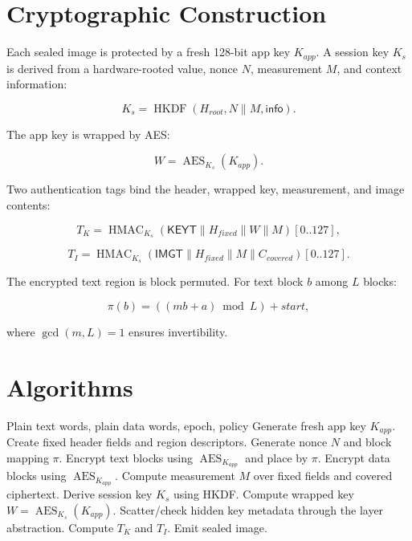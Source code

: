 \documentclass[conference]{IEEEtran}
\newcommand{\AES}{\operatorname{AES}}
\newcommand{\HKDF}{\operatorname{HKDF}}
\newcommand{\HMAC}{\operatorname{HMAC}}
\newcommand{\gcdop}{\operatorname{gcd}}
\begin{document}
\section{Cryptographic Construction}

Each sealed image is protected by a fresh 128-bit app key $K_{app}$. A session key $K_s$ is derived from a hardware-rooted value, nonce $N$, measurement $M$, and context information:

\begin{equation}
K_s = \HKDF(H_{root}, N \parallel M, \textsf{info}).
\end{equation}

The app key is wrapped by AES:

\begin{equation}
W = \AES_{K_s}(K_{app}).
\end{equation}

Two authentication tags bind the header, wrapped key, measurement, and image contents:

\begin{equation}
T_K = \HMAC_{K_s}(\textsf{KEYT} \parallel H_{fixed} \parallel W \parallel M)[0..127],
\end{equation}

\begin{equation}
T_I = \HMAC_{K_s}(\textsf{IMGT} \parallel H_{fixed} \parallel M \parallel C_{covered})[0..127].
\end{equation}

The encrypted text region is block permuted. For text block $b$ among $L$ blocks:

\begin{equation}
\pi(b)=((m b + a) \bmod L)+start,
\end{equation}

where $\gcdop(m,L)=1$ ensures invertibility.

\section{Algorithms}

\begin{algorithm}[!t]
\caption{Seal Image}
\label{alg:seal}
\footnotesize
\begin{algorithmic}[1]
\Require Plain text words, plain data words, epoch, policy
\State Generate fresh app key $K_{app}$.
\State Create fixed header fields and region descriptors.
\State Generate nonce $N$ and block mapping $\pi$.
\State Encrypt text blocks using $\AES_{K_{app}}$ and place by $\pi$.
\State Encrypt data blocks using $\AES_{K_{app}}$.
\State Compute measurement $M$ over fixed fields and covered ciphertext.
\State Derive session key $K_s$ using HKDF.
\State Compute wrapped key $W=\AES_{K_s}(K_{app})$.
\State Scatter/check hidden key metadata through the layer abstraction.
\State Compute $T_K$ and $T_I$.
\State Emit sealed image.
\end{algorithmic}
\end{algorithm}
\end{document}
